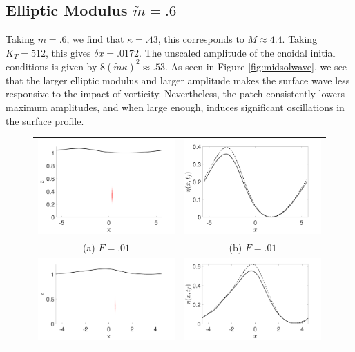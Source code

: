 \documentclass[a4paper,11pt]{article}
\begin{document}
\subsection*{Elliptic Modulus $\tilde{m}=.6$}
Taking $\tilde{m}=.6$, we find that $\kappa = .43$, this corresponds to $M \approx 4.4$.  Taking $K_{T}=512$, this gives $\delta x = .0172$.  The unscaled amplitude of the cnoidal initial conditions is given by $8(\tilde{m}\kappa)^{2}\approx .53$.  As seen in Figure \ref{fig:midsolwave}, we see that the larger elliptic modulus and larger amplitude makes the surface wave less responsive to the impact of vorticity.  Nevertheless, the patch consistently lowers maximum amplitudes, and when large enough, induces significant oscillations in the surface profile.  
\begin{figure}
\centering
\begin{tabular}{cc}
\includegraphics[width=.35\textwidth]{wave_over_vortices_m_pt6_w0_1} & \includegraphics[width=.35\textwidth]{profiles_m_pt6_w0_1}\\
(a)  $F=.01$ & (b)  $F=.01$\\
\includegraphics[width=.35\textwidth]{wave_over_vortices_m_pt6_w0_5} & \includegraphics[width=.35\textwidth]{profiles_m_pt6_w0_5}\\

\end{tabular}
\end{figure}
\end{document}
